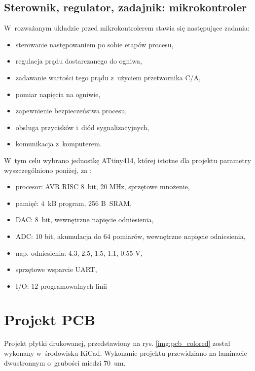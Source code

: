 \documentclass[polish,engineer]{polsl-msth}
\begin{document}
\subsection{Sterownik, regulator, zadajnik: mikrokontroler}
W~rozważanym układzie przed mikrokontrolerem stawia się następujące zadania:
\begin{itemize}
    \item sterowanie następowaniem po sobie etapów procesu,
    \item regulacja prądu dostarczanego do ogniwa,
    \item zadawanie wartości tego prądu z~użyciem przetwornika C/A,
    \item pomiar napięcia na ogniwie,
    \item zapewnienie bezpieczeństwa procesu,
    \item obsługa przycisków i~diód sygnalizacyjnych,
    \item komunikacja z~komputerem.
\end{itemize}
W~tym celu wybrano jednostkę ATtiny414, której istotne dla projektu parametry wyszczególniono poniżej, za \cite{tiny414datasheet}:
\begin{itemize}
    \item procesor: AVR RISC 8~bit, 20 MHz, sprzętowe mnożenie,
    \item pamięć: 4~kB program, 256 B~SRAM,
    \item DAC: 8~bit, wewnętrzne napięcie odniesienia,
    \item ADC: 10 bit, akumulacja do 64 pomiarów, wewnętrzne napięcie odniesienia, 
    \item nap. odniesienia: 4.3, 2.5, 1.5, 1.1, 0.55 V,
    \item sprzętowe wsparcie UART,
    \item I/O: 12 programowalnych linii
\end{itemize}

\section{Projekt PCB}
Projekt płytki drukowanej, przedstawiony na rys. \ref{img:pcb_colored} został wykonany w~środowisku KiCad. Wykonanie projektu przewidziano na laminacie dwustronnym o~grubości miedzi 70~um.
\end{document}
